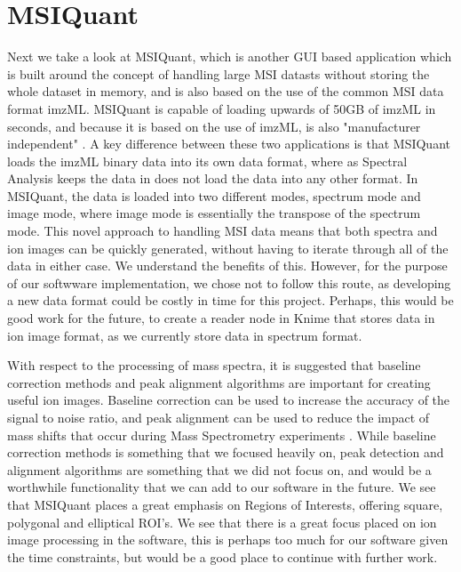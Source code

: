 \documentclass[11pt,openany]{book}
\begin{document}
\section{MSIQuant}
Next we take a look at MSIQuant, which is another GUI based application which is built around the concept of handling large MSI datasts without storing the whole dataset in memory, and is also based on the use of the common MSI data format imzML. MSIQuant is capable of loading upwards of 50GB of imzML in seconds, and because it is based on the use of imzML, is also "manufacturer independent" \cite{MSI_QUANT_Article}. A key difference between these two applications is that MSIQuant loads the imzML binary data into its own data format, where as Spectral Analysis keeps the data in does not load the data into any other format. In MSIQuant, the data is loaded into two different modes, spectrum mode and image mode, where image mode is essentially the transpose of the spectrum mode. This novel approach to handling MSI data means that both spectra and ion images can be quickly generated, without having to iterate through all of the data in either case. We understand the benefits of this. However, for the purpose of our softwware implementation, we chose not to follow this route, as developing a new data format could be costly in time for this project. Perhaps, this would be good work for the future, to create a reader node in Knime that stores data in ion image format, as we currently store data in spectrum format. 

With respect to the processing of mass spectra, it is suggested that baseline correction methods and peak alignment algorithms are important for creating useful ion images. Baseline correction can be used to increase the accuracy of the signal to noise ratio, and peak alignment can be used to reduce the impact of mass shifts that occur during Mass Spectrometry experiments \cite{MSI_QUANT_Article}. While baseline correction methods is something that we focused heavily on, peak detection and alignment algorithms are something that we did not focus on, and would be a worthwhile functionality that we can add to our software in the future. We see that MSIQuant places a great emphasis on Regions of Interests, offering square, polygonal and elliptical ROI's. We see that there is a great focus placed on ion image processing in the software, this is perhaps too much for our software given the time constraints, but would be a good place to continue with further work.

\newpage
\end{document}
